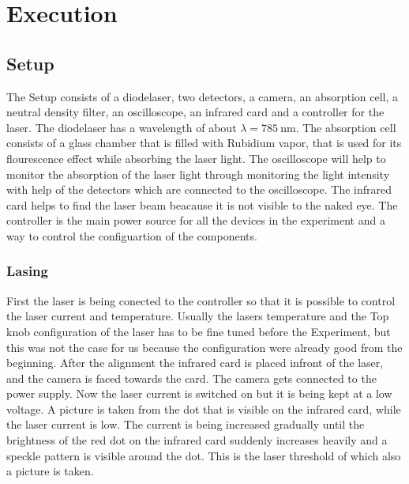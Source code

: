 \section{Execution}
\label{sec:Durchführung}

\subsection{Setup}
The Setup consists of a diodelaser, two detectors, a camera, an absorption cell, a neutral density filter, an oscilloscope, an infrared card and a controller for the laser.
The diodelaser has a wavelength of about $\lambda = \SI{785}{\nano\meter}$.
The absorption cell consists of a glass chamber that is filled with Rubidium vapor, that is used for its flourescence effect while absorbing the laser light.
The oscilloscope will help to monitor the absorption of the laser light through monitoring the light intensity with help of the detectors which are connected to the oscilloscope.
The infrared card helps to find the laser beam beacause it is not visible to the naked eye.
The controller is the main power source for all the devices in the experiment and a way to control the configuartion of the components.

\subsubsection{Lasing}
First the laser is being conected to the controller so that it is possible to control the laser current and temperature.
Usually the lasers temperature and the Top knob configuration of the laser has to be fine tuned before the Experiment, but this was not the case for us because the configuration were already good from the beginning.
After the alignment the infrared card is placed infront of the laser, and the camera is faced towards the card.
The camera gets connected to the power supply.
Now the laser current is switched on but it is being kept at a low voltage.
A picture is taken from the dot that is visible on the infrared card, while the laser current is low.
The current is being increased gradually until the brightness of the red dot on the infrared card suddenly increases heavily and a speckle pattern is visible around the dot.
This is the laser threshold of which also a picture is taken.

